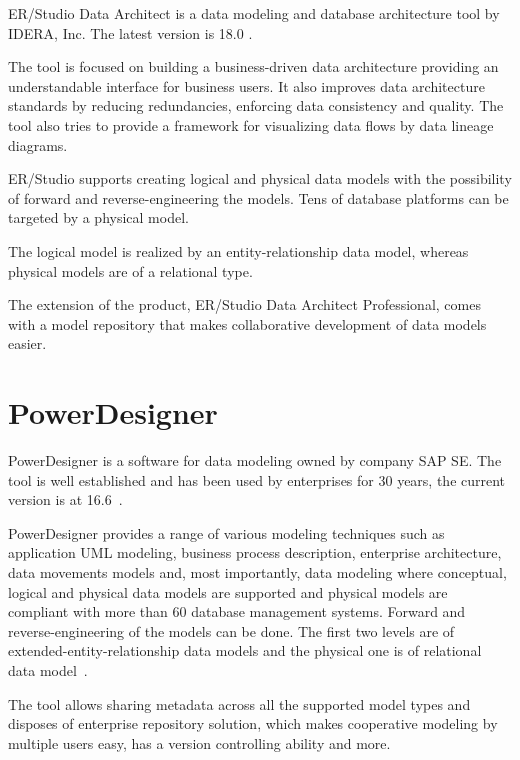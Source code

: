 ER/Studio Data Architect is a data modeling and database architecture tool by IDERA, Inc. 
The latest version is 18.0 \cite{ErStudio}.

The tool is focused on building a business-driven data architecture providing an understandable interface for business users. It also improves data architecture standards by reducing redundancies, enforcing data consistency and quality.
The tool also tries to provide a framework for visualizing data flows by data lineage diagrams. 

ER/Studio supports creating logical and physical data models with the possibility of forward and reverse-engineering the models. Tens of database platforms can be targeted by a physical model.

The logical model is realized by an entity-relationship data model, whereas physical models are of a relational type.

The extension of the product, ER/Studio Data Architect Professional, comes with a model repository that makes collaborative development of data models easier. 

\section{PowerDesigner}

PowerDesigner is a software for data modeling owned by company SAP SE. The tool is well established and has been used by enterprises for 30 years, the current version is at 16.6~\cite{PowerDesignerHistory}.

PowerDesigner provides a range of various modeling techniques such as application UML modeling, business process description, enterprise architecture, data movements models and, most importantly, data modeling where conceptual, logical and physical data models are supported and physical models are compliant with more than 60 database management systems.
Forward and reverse-engineering of the models can be done.
The first two levels are of extended-entity-relationship data models and the physical one is of relational data model~\cite{PowerDesignerFeatures}.

The tool allows sharing metadata across all the supported model types and disposes of enterprise repository solution, which makes cooperative modeling by multiple users easy, has a version controlling ability and more.
